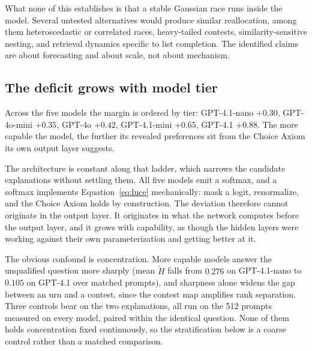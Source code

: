\documentclass[11pt]{article}
\begin{document}
What none of this establishes is that a stable Gaussian race runs inside the
model. Several untested alternatives would produce similar reallocation, among
them heteroscedastic or correlated races, heavy-tailed contests,
similarity-sensitive nesting, and retrieval dynamics specific to list
completion. The identified claims are about forecasting and about scale, not
about mechanism.

\subsection{The deficit grows with model tier}
\label{sec:tier}

Across the five models the margin is ordered by tier: GPT-4.1-nano
$+0.30$, GPT-4o-mini $+0.35$, GPT-4o $+0.42$, GPT-4.1-mini $+0.65$,
GPT-4.1 $+0.88$. The more capable the model, the further its revealed
preferences sit from the Choice Axiom its own output layer suggests.

The architecture is constant along that ladder, which narrows the candidate
explanations without settling them. All five models emit a
softmax, and a softmax implements
Equation~\eqref{eq:luce} mechanically: mask a logit, renormalize, and the
Choice Axiom holds by construction. The deviation therefore cannot
originate in the output layer. It originates in what the network computes
before the output layer, and it grows with capability, as though the hidden
layers were working against their own parameterization and getting better
at it.

The obvious confound is concentration. More capable models answer the
unqualified question more sharply (mean $\tilde H$ falls from $0.276$ on
GPT-4.1-nano to $0.105$ on GPT-4.1 over matched prompts), and sharpness
alone widens the gap between an urn and a contest, since the contest map
amplifies rank separation. Three controls
bear on the two explanations, all run on the 512 prompts measured on every
model, paired within the identical question. None of them holds concentration
fixed continuously, so the stratification below is a coarse control rather
than a matched comparison.
\end{document}
